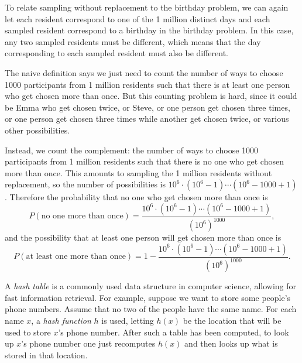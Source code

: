 {\begin{solution}
{            To relate sampling without replacement to the birthday problem, we can again let each resident correspond to one of the 1 million distinct days and each sampled resident correspond to a birthday in the birthday problem. 
            In this case, any two sampled residents must be different, which means that the day corresponding to each sampled resident must also be different. 
            \item 
            The naive definition says we just need to count the number of ways to choose 1000 participants from 1 million residents such that there is at least one person who get chosen more than once. 
            But this counting problem is hard, since it could be Emma who get chosen twice, or Steve, or one person get chosen three times, or one person get chosen three times while another get chosen twice, or various other possibilities. 

            Instead, we count the complement: the number of ways to choose 1000 participants from 1 million residents such that there is no one who get chosen more than once. 
            This amounts to sampling the 1 million residents without replacement, so the number of possibilities is $10^6 \cdot (10^6-1) \cdots (10^6-1000+1)$. 
            Therefore the probability that no one who get chosen more than once is 
            \begin{equation*}
                P(\text{no one more than once}) = \frac{10^6 \cdot (10^6-1) \cdots (10^6-1000+1)}{(10^6)^{1000}}, 
            \end{equation*}
            and the possibility that at least one person will get chosen more than once is 
            \begin{equation*}
                P(\text{at least one more than once}) = 1 - \frac{10^6 \cdot (10^6-1) \cdots (10^6-1000+1)}{(10^6)^{1000}}. 
            \end{equation*}
        }
    \end{solution}
    \item%
    A \textit{hash table} is a commonly used data structure in computer science, allowing for fast information retrieval. 
    For example, suppose we want to store some people's phone numbers. 
    Assume that no two of the people have the same name. 
    For each name $x$, a \textit{hash function} $h$ is used, letting $h(x)$ be the location that will be used to store $x$'s phone number. 
    After such a table has been computed, to look up $x$'s phone number one just recomputes $h(x)$ and then looks up what is stored in that location. 

}
